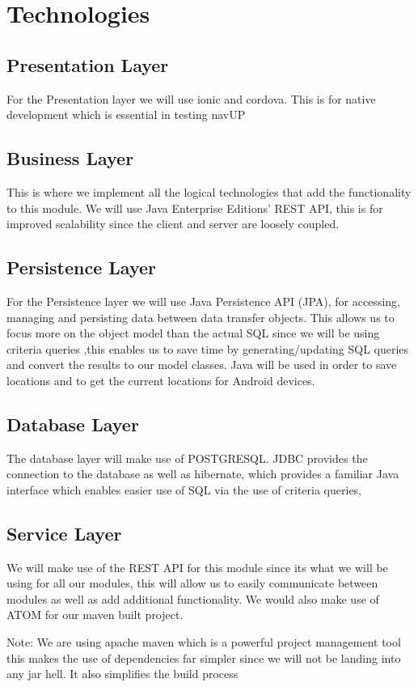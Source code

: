 \documentclass{article}
\begin{document}
\section{Technologies}
		
		\subsection{Presentation Layer}
		For the Presentation layer we will use ionic and cordova. This is for native development which is essential in testing navUP
		
		\subsection{Business Layer}
		This is where we implement all the logical technologies that add the functionality to this module. We will use Java Enterprise Editions' REST API, this is for improved scalability since the client and server are loosely coupled.
		
		\subsection{Persistence Layer}
		For the Persistence layer we will use Java Persistence API (JPA), for accessing, managing and persisting data between data transfer objects. This allows us to focus more on the object model than the actual SQL since we will be using criteria queries ,this enables us to save time by generating/updating SQL queries and convert the results to our model classes.
		Java will be used in order to save locations and to get the current locations for Android devices.
		
		\subsection{Database Layer}
		The database layer will make use of POSTGRESQL. JDBC provides the connection to the database as well as hibernate, which provides a familiar Java interface which enables easier use of SQL via the use of criteria queries, 
	
		
		\subsection{Service Layer}
		We will make use of the REST API for this module since its what we will be using for all our modules, this will allow us to easily communicate between modules as well as add additional functionality. We would also make use of ATOM for our maven built project. 

		Note: We are using apache maven which is a powerful project management tool this makes the use of dependencies far simpler since we will not be landing into any jar hell. It also simplifies the build process
 	
	 \newpage
 	
\end{document}
